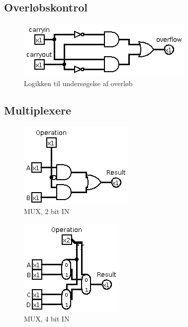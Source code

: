 \documentclass[10pt,a4paper,danish]{article}
\begin{document}
\subsection{Overløbskontrol}
\begin{figure}[htb]
\begin{center}
\leavevmode
\includegraphics[scale=0.70]{overflow-detection.png}
\end{center}
\caption{Logikken til undersøgelse af overløb}
\label{fig:overflow}
\end{figure}

\subsection{Multiplexere}
\begin{figure}[htb]
\begin{center}
\leavevmode
\includegraphics[scale=0.70]{mux-2bit.png}
\end{center}
\caption{MUX, 2 bit IN}
\label{fig:mux2bit} 
\end{figure}

\begin{figure}[htb]
\begin{center}
\leavevmode
\includegraphics[scale=0.70]{mux-4bit.png}
\end{center}
\caption{MUX, 4 bit IN}
\label{fig:mux4bit} 
\end{figure}
\end{document}
